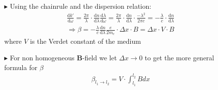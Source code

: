 \documentclass[10pt,a4paper]{beamer}
\begin{document}
\begin{frame}
\begin{itemize}
\item[$\blacktriangleright$] Using the chainrule and the dispersion relation:
\begin{align}
\frac{\text{d} k'}{\text{d} \omega} = \frac{2\pi}{\lambda}\cdot\frac{\text{d} n}{\text{d} \lambda}\frac{\text{d} \lambda}{\text{d} \omega} = \frac{2\pi}{\lambda}\cdot \frac{\text{d} n}{\text{d} \lambda} \cdot \frac{-\lambda^2}{2\pi c} = -\frac{\lambda}{c} \cdot \frac{\text{d} n}{\text{d} \lambda}
\end{align}\pause
\begin{align}
\Rightarrow \beta = -\frac{\lambda}{c} \frac{\text{d} n}{\text{d} \lambda}\frac{e}{2m_e}\cdot\Delta x\cdot B = \Delta x \cdot V \cdot B
\label{Drehwinkel_2}
\end{align}
where $V$ is the Verdet constant of the medium\pause
\item[$\blacktriangleright$] For non homogeneous \textbf{B}-field we let $\Delta x \rightarrow 0$ to get the more general formula for $\beta$
\begin{align}
\beta_{l_1\rightarrow l_2} = V \cdot \int_{l_1}^{l_2} B dx
\end{align}
\end{itemize}
\end{frame}
\end{document}
